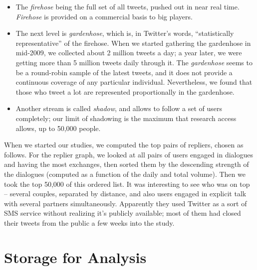 \documentclass[10pt,oneside]{memoir}
\begin{document}
\begin{itemize}


\item The {\itshape firehose} being the full set of all tweets, pushed out in near real time.  {\itshape Firehose} is provided on a commercial basis to big players.  




\item The next level is {\itshape gardenhose}, which is, in Twitter's words, ``statistically representative'' of the firehose.  When we started gathering the gardenhose in mid-2009, we collected about 2 million tweets a day; a year later, we were getting more than 5 million tweets daily through it.  The {\itshape gardenhose} seems to be a round-robin sample of the latest tweets, and it does not provide a continuous coverage of any particular individual.  Nevertheless, we found that those who tweet a lot are represented proportionally in the gardenhose.




\item Another stream is called {\itshape shadow}, and allows to follow a set of users completely; our limit of shadowing is the maximum that research access allows, up to 50,000 people.  



\end{itemize}

When we started our studies, we computed the top pairs of repliers, chosen as follows.  For the replier graph, we looked at all pairs of users engaged in dialogues and having the most exchanges, then sorted them by the descending strength of the dialogues (computed as a function of the daily and total volume).  Then we took the top 50,000 of this ordered list.  It was interesting to see who was on top -- several couples, separated by distance, and also users engaged in explicit talk with several partners simultaneously.  Apparently they used Twitter as a sort of SMS service without realizing it's publicly available; most of them had closed their tweets from the public a few weeks into the study.


\pagebreak \section{Storage for Analysis}
\label{storageforanalysis}
\end{document}
